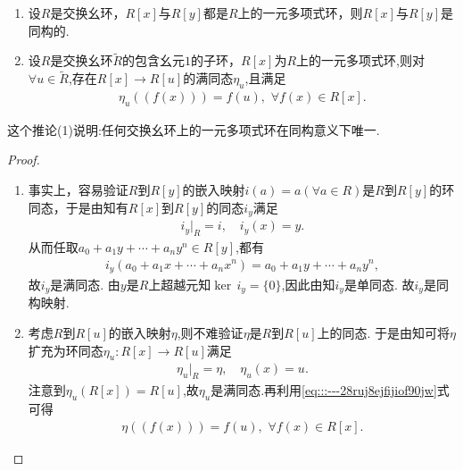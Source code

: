 \documentclass[../../main.tex]{subfiles}%
\begin{document}
\begin{corollary}\label{corollary:同一个环生成的一元多项式环必同构}
\begin{enumerate}[(1)]
\item\label{corollary:同一个环生成的一元多项式环必同构-1} 设$R$是交换幺环，$R[x]$与$R[y]$都是$R$上的一元多项式环，则$R[x]$与$R[y]$是同构的.

\item\label{corollary:同一个环生成的一元多项式环必同构-2} 设$R$是交换幺环$\widetilde{R}$的包含幺元$1$的子环，$R[x]$为$R$上的一元多项式环,则对$\forall u\in \widetilde{R}$,存在$R[x]\to R[u]$的满同态$\eta_u$,且满足
\begin{align*}
\eta_u((f(x)))=f(u),\,\,\forall f(x)\in R[x].
\end{align*}
\end{enumerate}
\end{corollary}
\begin{note}
这个推论(1)说明:任何交换幺环上的一元多项式环在同构意义下唯一.
\end{note}
\begin{proof}
\begin{enumerate}[(1)]
\item 事实上，容易验证$R$到$R[y]$的嵌入映射$i(a)=a(\forall a\in R)$是$R$到$R[y]$的环同态，于是由知有$R[x]$到$R[y]$的同态$i_y$满足
\begin{align*}
i_y|_R=i,\quad i_y(x)=y.
\end{align*}
从而任取$a_0+a_1y+\cdots+a_ny^n\in R[y]$,都有
\begin{align*}
i_y(a_0+a_1x+\cdots+a_nx^n)=a_0+a_1y+\cdots+a_ny^n,
\end{align*}
故$i_y$是满同态. 由$y$是$R$上超越元知$\ker\,i_y=\{0\}$,因此由知$i_y$是单同态. 故$i_y$是同构映射.

\item 考虑$R$到$R[u]$的嵌入映射$\eta$,则不难验证$\eta$是$R$到$R[u]$上的同态. 于是由知可将$\eta$扩充为环同态$\eta_u:R[x]\to R[u]$满足
\begin{align}\label{eq:::---28ruj8ejfijiof90jw}
\eta_u|_R=\eta,\quad \eta_u(x)=u.
\end{align}
注意到$\eta_u(R[x])=R[u]$,故$\eta_u$是满同态.再利用\eqref{eq:::---28ruj8ejfijiof90jw}式可得
\begin{align*}
\eta((f(x)))=f(u),\,\,\forall f(x)\in R[x].
\end{align*}
\end{enumerate}
\end{proof}
\end{document}

